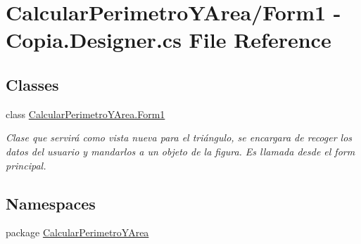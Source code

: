 \hypertarget{_form1_01-_01_copia_8_designer_8cs}{}\section{Calcular\+Perimetro\+Y\+Area/\+Form1 -\/ Copia.\+Designer.\+cs File Reference}
\label{_form1_01-_01_copia_8_designer_8cs}
\subsection*{Classes}
\begin{DoxyCompactItemize}
\item 
class \hyperlink{class_calcular_perimetro_y_area_1_1_form1}{Calcular\+Perimetro\+Y\+Area.\+Form1}
\begin{DoxyCompactList}\small\item\em Clase que servirá como vista nueva para el triángulo, se encargara de recoger los datos del usuario y mandarlos a un objeto de la figura. Es llamada desde el form principal. \end{DoxyCompactList}\end{DoxyCompactItemize}
\subsection*{Namespaces}
\begin{DoxyCompactItemize}
\item 
package \hyperlink{namespace_calcular_perimetro_y_area}{Calcular\+Perimetro\+Y\+Area}
\end{DoxyCompactItemize}
